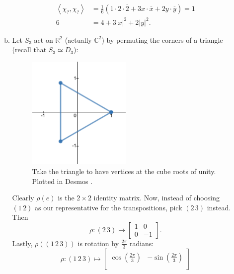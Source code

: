 \documentclass[12pt]{article}
\newcommand{\cx}{\mathbb{C}}
\newcommand{\real}{\mathbb{R}}
\newcommand{\vbrack}[1]{\left \langle #1 \right \rangle}
\theoremstyle{definition}
\begin{document}
\begin{enumerate}[start=0]
\begin{enumerate}[(a)]
\begin{equation}
            \begin{split}
                \vbrack{\chi_{?} , \chi_{?}} & = \frac{1}{6} \left( 1 \cdot 2 \cdot \overline{2} + 3x \cdot \overline{x} + 2y \cdot \overline{y }\right) = 1 \\
                6 &= 4 + 3|x|^2 + 2|y|^2.
            \end{split}
        \end{equation}
        \item Let $S_3$ act on $\real^2$ (actually $\cx^2$) by permuting the corners of a triangle (recall that $S_3 \simeq D_3$): 
        \begin{figure}[H]
            \centering
            \includegraphics[width = 0.5\textwidth]{2.png}
            \caption{Take the triangle to have vertices at the cube roots of unity. Plotted in Desmos \cite{Desmos}.}
            \label{fig:Figure2}
        \end{figure}
        Clearly $\rho(e)$ is the $2 \times 2$ identity matrix. Now, instead of choosing $(1\,2)$ as our representative for the transpositions, pick $(2\,3)$ instead. Then 
        \begin{equation}
            \rho : (2\,3) \mapsto 
            \begin{bmatrix}
                1 & 0 \\
                0 & -1
            \end{bmatrix}.
        \end{equation}
        Lastly, $\rho \left( (1\,2\,3) \right)$ is rotation by $\frac{2\pi}{3}$ radians:
        \begin{equation}
            \rho : (1\,2\,3) \mapsto 
            \begin{bmatrix}
                \cos \left( \frac{2\pi }{3} \right) & -\sin \left( \frac{2\pi }{3} \right) \\[0.5em]

\end{bmatrix}
\end{equation}
\end{enumerate}
\end{enumerate}
\end{document}
